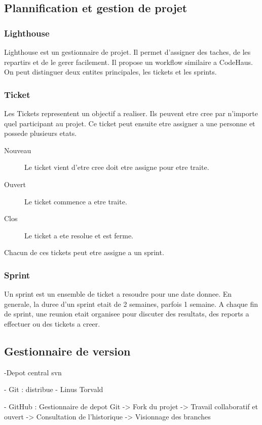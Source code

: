 \subsection{Plannification et gestion de projet}
\subsubsection{Lighthouse}
Lighthouse est un gestionnaire de projet. Il permet d'assigner des taches, de les repartirs et de le gerer facilement. Il propose un workflow similaire a CodeHaus. On peut distinguer deux entites principales, les tickets et les sprints.
\subsubsection{Ticket}
Les Tickets representent un objectif a realiser. Ils peuvent etre cree par n'importe quel participant au projet. Ce ticket peut ensuite etre assigner a une personne et possede plusieurs etats.

\begin{description}
 \item[Nouveau] Le ticket vient d'etre cree doit etre assigne pour etre traite.
\item[Ouvert] Le ticket commence a etre traite.
\item[Clos] Le ticket a ete resolue et est ferme.
 \end{description}
Chacun de ces tickets peut etre assigne a un sprint.
\subsubsection{Sprint}
Un sprint est un ensemble de ticket a resoudre pour une date donnee. En generale, la duree d'un sprint etait de 2 semaines, parfois 1 semaine. A chaque fin de sprint, une reunion etait organisee pour discuter des resultats, des reports a effectuer ou des tickets a creer.
\subsection{Gestionnaire de version}
-Depot central svn

- Git : distribue
- Linus Torvald

- GitHub : Gestionnaire de depot Git
-> Fork du projet
-> Travail collaboratif et ouvert 
-> Consultation de l'historique
-> Visionnage des branches

